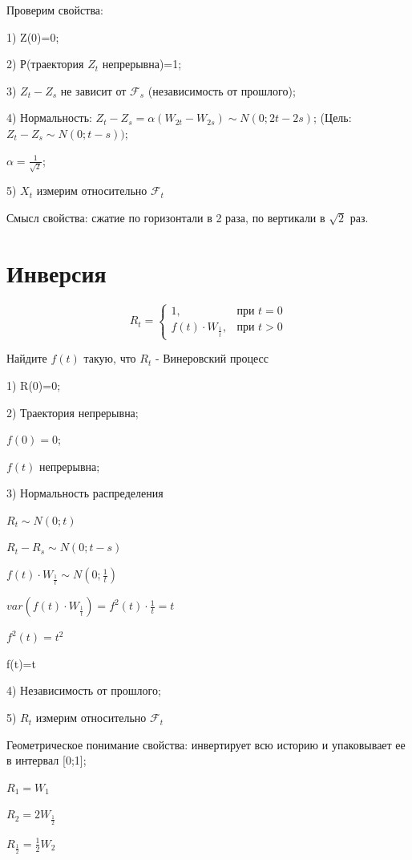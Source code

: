 \documentclass{article}
\begin{document}
Проверим свойства:

1) Z(0)=0;

2) Р(траектория $Z_t$ непрерывна)=1;

3) $Z_t-Z_s$ не зависит от $\mathcal{F}_s$ (независимость от прошлого);

4) Нормальность: $Z_t-Z_s= \alpha (W_{2t} - W_{2s}) \sim N(0;2t-2s)$; (Цель: $Z_t-Z_s \sim N(0;t-s))$;

$\alpha = \frac{1}{\sqrt{2}}$;

5) $X_t$ измерим относительно $\mathcal{F}_t$

Смысл свойства: сжатие по горизонтали в 2 раза, по вертикали в $\sqrt{2}$ раз.

\section*{Инверсия}

\begin{equation*}
R_t =
 \begin{cases}
   1, &\text{при $t=0$}\\
   f(t)\cdot W_\frac{1}{t}, &\text{при $t>0$}
 \end{cases}
\end{equation*}

Найдите $f(t)$ такую, что $R_t$ - Винеровский процесс

1) R(0)=0;

2) Траектория непрерывна;

$f(0)=0$;

$f(t)$ непрерывна;

3) Нормальность распределения

$R_t\sim N (0;t)$

$R_t-R_s \sim N (0;t-s)$

$f(t)\cdot W_\frac{1}{t} \sim N (0;\frac{1}{t})$

$var(f(t)\cdot W_\frac{1}{t})=f^2(t)\cdot \frac{1}{t}=t$

$f^2(t)=t^2$

f(t)=t

4) Независимость от прошлого;

5) $R_t$ измерим относительно $\mathcal{F}_t$

Геометрическое понимание свойства: инвертирует всю историю и упаковывает ее в интервал [0;1];

$R_1=W_1$

$R_2=2W_\frac{1}{2}$

$R_\frac{1}{2}=\frac{1}{2}W_2$
\end{document}
